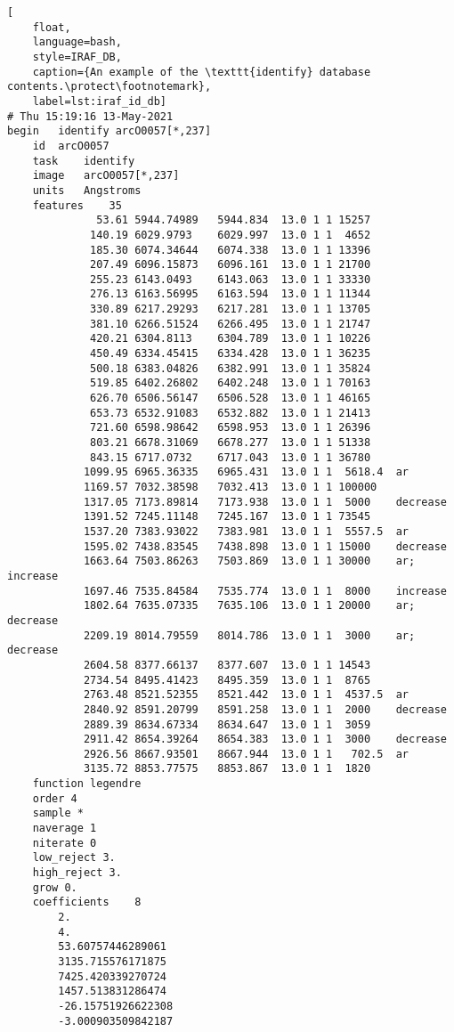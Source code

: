\begin{lstlisting}[
    float,
    language=bash,
    style=IRAF_DB,
    caption={An example of the \texttt{identify} database contents.\protect\footnotemark},
    label=lst:iraf_id_db]
# Thu 15:19:16 13-May-2021
begin	identify arcO0057[*,237]
    id	arcO0057
    task	identify
    image	arcO0057[*,237]
    units	Angstroms
    features	35
              53.61 5944.74989   5944.834  13.0 1 1 15257
             140.19 6029.9793    6029.997  13.0 1 1  4652
             185.30 6074.34644   6074.338  13.0 1 1 13396
             207.49 6096.15873   6096.161  13.0 1 1 21700
             255.23 6143.0493    6143.063  13.0 1 1 33330
             276.13 6163.56995   6163.594  13.0 1 1 11344
             330.89 6217.29293   6217.281  13.0 1 1 13705
             381.10 6266.51524   6266.495  13.0 1 1 21747
             420.21 6304.8113    6304.789  13.0 1 1 10226
             450.49 6334.45415   6334.428  13.0 1 1 36235
             500.18 6383.04826   6382.991  13.0 1 1 35824
             519.85 6402.26802   6402.248  13.0 1 1 70163
             626.70 6506.56147   6506.528  13.0 1 1 46165
             653.73 6532.91083   6532.882  13.0 1 1 21413
             721.60 6598.98642   6598.953  13.0 1 1 26396
             803.21 6678.31069   6678.277  13.0 1 1 51338
             843.15 6717.0732    6717.043  13.0 1 1 36780
            1099.95 6965.36335   6965.431  13.0 1 1  5618.4  ar
            1169.57 7032.38598   7032.413  13.0 1 1 100000
            1317.05 7173.89814   7173.938  13.0 1 1  5000    decrease
            1391.52 7245.11148   7245.167  13.0 1 1 73545
            1537.20 7383.93022   7383.981  13.0 1 1  5557.5  ar
            1595.02 7438.83545   7438.898  13.0 1 1 15000    decrease
            1663.64 7503.86263   7503.869  13.0 1 1 30000    ar; increase
            1697.46 7535.84584   7535.774  13.0 1 1  8000    increase
            1802.64 7635.07335   7635.106  13.0 1 1 20000    ar; decrease
            2209.19 8014.79559   8014.786  13.0 1 1  3000    ar; decrease
            2604.58 8377.66137   8377.607  13.0 1 1 14543
            2734.54 8495.41423   8495.359  13.0 1 1  8765
            2763.48 8521.52355   8521.442  13.0 1 1  4537.5  ar
            2840.92 8591.20799   8591.258  13.0 1 1  2000    decrease
            2889.39 8634.67334   8634.647  13.0 1 1  3059
            2911.42 8654.39264   8654.383  13.0 1 1  3000    decrease
            2926.56 8667.93501   8667.944  13.0 1 1   702.5  ar
            3135.72 8853.77575   8853.867  13.0 1 1  1820
    function legendre
    order 4
    sample *
    naverage 1
    niterate 0
    low_reject 3.
    high_reject 3.
    grow 0.
    coefficients	8
        2.
        4.
        53.60757446289061
        3135.715576171875
        7425.420339270724
        1457.513831286474
        -26.15751926622308
        -3.000903509842187

\end{lstlisting}

